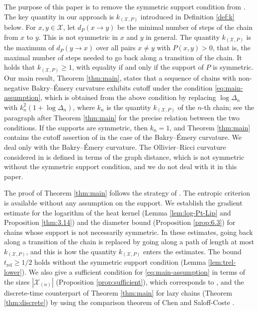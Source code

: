 \documentclass[a4paper, reqno, 11pt]{amsart}
\theoremstyle{definition}
\begin{document}
The purpose of this paper is to remove the symmetric support condition from \cite[Theorem 1]{Salez2024}.
The key quantity in our approach is $k_{(\mathcal{X}, P)}$ introduced in Definition \ref{def:k} below.
For $x, y \in \mathcal{X}$, let $d_{P}(x \to y)$ be the minimal number of steps of the chain from $x$ to $y$.
This is not symmetric in $x$ and $y$ in general.
The quantity $k_{(\mathcal{X}, P)}$ is the maximum of $d_{P}(y \to x)$ over all pairs $x \ne y$ with $P(x,y) > 0$,
that is, the maximal number of steps needed to go back along a transition of the chain.
It holds that $k_{(\mathcal{X}, P)} \ge 1$, with equality if and only if the support of $P$ is symmetric.
Our main result, Theorem \ref{thm:main}, states that a sequence of chains with non-negative Bakry--\'Emery curvature exhibits cutoff under the condition \eqref{eq:main-assumption},
which is obtained from the above condition by replacing $\log \Delta_n$ with $k_n^{2}\left(1 + \log \Delta_n\right)$, where $k_n$ is the quantity $k_{(\mathcal{X}, P)}$ of the $n$-th chain;
see the paragraph after Theorem \ref{thm:main} for the precise relation between the two conditions.
If the supports are symmetric, then $k_n = 1$, and Theorem \ref{thm:main} contains the cutoff assertion of \cite[Theorem 1]{Salez2024} in the case of the Bakry--\'Emery curvature.
We deal only with the Bakry--\'Emery curvature.
The Ollivier--Ricci curvature considered in \cite{Salez2024} is defined in terms of the graph distance, which is not symmetric without the symmetric support condition, and we do not deal with it in this paper.

The proof of Theorem \ref{thm:main} follows the strategy of \cite{Salez2024}.
The entropic criterion \cite[Theorem 5]{Salez2024} is available without any assumption on the support.
We establish the gradient estimate for the logarithm of the heat kernel (Lemma \ref{lem:log-Pt-Lip} and Proposition \ref{thm:3.14}) and the diameter bound (Proposition \ref{prop:6.3}) for chains whose support is not necessarily symmetric.
In these estimates, going back along a transition of the chain is replaced by going along a path of length at most $k_{(\mathcal{X}, P)}$, and this is how the quantity $k_{(\mathcal{X}, P)}$ enters the estimates.
The bound $t_{\mathrm{rel}} \ge 1/2$ holds without the symmetric support condition (Lemma \ref{lem:trel-lower}). 
We also give a sufficient condition for \eqref{eq:main-assumption} in terms of the sizes $|\mathcal{X}_{(n)}|$ (Proposition \ref{prop:sufficient}), which corresponds to \cite[Corollary 2]{Salez2024},
and the discrete-time counterpart of Theorem \ref{thm:main} for lazy chains (Theorem \ref{thm:discrete}) by using the comparison theorem of Chen and Saloff-Coste \cite{CSC2013}.
\end{document}
